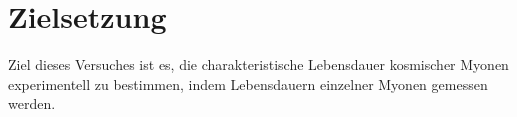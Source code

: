 \section{Zielsetzung}
Ziel dieses Versuches ist es, die charakteristische Lebensdauer kosmischer Myonen experimentell zu bestimmen,
indem Lebensdauern einzelner Myonen gemessen werden. 